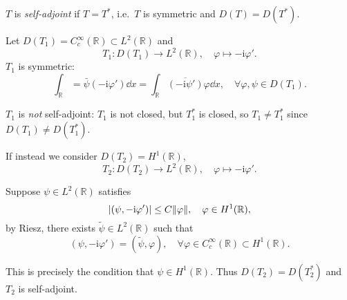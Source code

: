 \documentclass[a4paper,11pt]{article}
\begin{document}
	$T$ is \emph{self-adjoint} if $T = T^*$, i.e.\ $T$ is symmetric and $D(T) = D(T^*)$.

	\begin{ex}
		Let $D(T_1) = C ^{\infty}_c(\mathbb{R}) \subset L^2(\mathbb{R})$ and 
		\[
			T_1 : D(T_1) \to L^2(\mathbb{R}),\quad \varphi \mapsto -\mathrm{i} \varphi'.
		\]
		$T_1$ is symmetric:
		\[
			\int _{\mathbb{R}} = \bar \psi(-\mathrm{i} \varphi') \dd{x} = \int _{\mathbb{R}} \overline{(-\mathrm{i} \psi')} \varphi \dd{x}, \quad \forall \varphi,\psi \in D(T_1).
		\]
		
		$T_1$ is \emph{not} self-adjoint: $T_1$ is not closed, but $T_1^*$ is closed, so $T_1 \neq T_1^*$ since $D(T_1)\neq D(T_1^*)$.

		If instead we consider $D(T_2) = H^1(\mathbb{R})$, 
		\[
			T_2 : D(T_2) \to L^2(\mathbb{R}), \quad \varphi \mapsto - \mathrm{i} \varphi'.
		\]
		
		Suppose $\psi \in L^2(\mathbb{R})$ satisfies
		\[
			\abs{(\psi, - \mathrm{i} \varphi')} \leq C \norm{\varphi}, \quad \varphi \in H^1(\mathbb{R}),
		\]
		by Riesz, there exists $\tilde \psi \in L^2(\mathbb{R})$ such that
		\[
			(\psi, - \mathrm{i} \varphi') = (\tilde \psi, \varphi), \quad \forall \varphi \in C ^{\infty}_c (\mathbb{R}) \subset H^1(\mathbb{R}).
		\]
		
		This is precisely the condition that $\psi \in H^1(\mathbb{R})$. Thus $D(T_2) = D(T_2^*)$ and $T_2$ is self-adjoint. 
		 
	\end{ex}
	
	  
\end{document}

